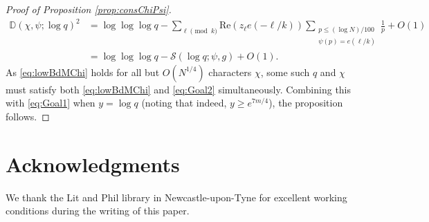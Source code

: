 \documentclass[10pt]{amsart}
\theoremstyle{definition}
\newcommand{\mc}{\mathcal}
\newcommand{\mb}{\mathbb}
\renewcommand{\ss}{\substack}
\begin{document}
\begin{proof}[Proof of Proposition \ref{prop:consChiPsi}]
\begin{align}
\mb{D}(\chi,\psi;\log q)^2 &= \log\log\log q - \sum_{\ell \pmod{k}} \text{Re}(z_\ell e(-\ell/k)) \sum_{\ss{p \leq (\log N)/100 \\ \psi(p) = e(\ell/k)}} \frac{1}{p} + O(1) \nonumber \\
&= \log\log\log q - \mc{S}(\log q; \psi,g) + O(1). \label{eq:Goal2}
\end{align}
As \eqref{eq:lowBdMChi} holds for all but $O(N^{1/4})$ characters $\chi$, some such $q$ and $\chi$ must satisfy both \eqref{eq:lowBdMChi} and \eqref{eq:Goal2} simultaneously. Combining this with \eqref{eq:Goal1} when $y = \log q$ (noting that indeed, $y\geq e^{7m/4}$), the proposition follows.
\end{proof}

\section*{Acknowledgments}
\noindent We thank the Lit and Phil library in Newcastle-upon-Tyne for excellent working conditions during the writing of this paper.



\end{document}
